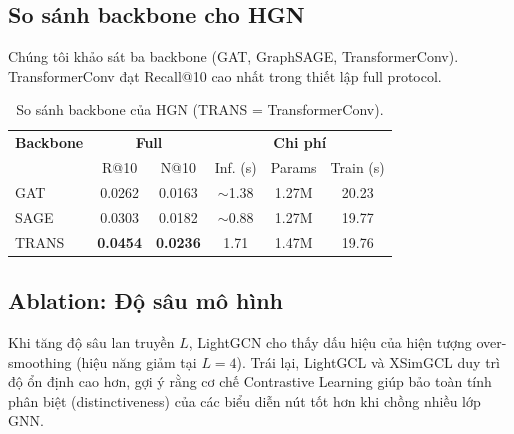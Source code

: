 \documentclass[11pt]{article}
\begin{document}
\subsection{So sánh backbone cho HGN}
Chúng tôi khảo sát ba backbone (GAT, GraphSAGE, TransformerConv). TransformerConv đạt Recall@10 cao nhất trong thiết lập full protocol.

\begin{table}[!htbp]
    \centering
    \small
    \setlength{\tabcolsep}{3pt}
    \renewcommand{\arraystretch}{1.1}
    \begin{tabular}{l|cc|ccc}
        \toprule
        \textbf{Backbone} & \multicolumn{2}{c|}{\textbf{Full}} & \multicolumn{3}{c}{\textbf{Chi phí}}                                   \\
                          & R@10                               & N@10                                 & Inf. (s)   & Params & Train (s) \\
        \midrule
        GAT               & 0.0262                             & 0.0163                               & $\sim$1.38 & 1.27M  & 20.23     \\
        SAGE              & 0.0303                             & 0.0182                               & $\sim$0.88 & 1.27M  & 19.77     \\
        TRANS             & \textbf{0.0454}                    & \textbf{0.0236}                      & 1.71       & 1.47M  & 19.76     \\
        \bottomrule
    \end{tabular}
    \caption{So sánh backbone của HGN (TRANS = TransformerConv).}
    \label{tab:backbone}
\end{table}


\subsection{Ablation: Độ sâu mô hình}
Khi tăng độ sâu lan truyền $L$, LightGCN cho thấy dấu hiệu của hiện tượng over-smoothing (hiệu năng giảm tại $L=4$). Trái lại, LightGCL và XSimGCL duy trì độ ổn định cao hơn, gợi ý rằng cơ chế Contrastive Learning giúp bảo toàn tính phân biệt (distinctiveness) của các biểu diễn nút tốt hơn khi chồng nhiều lớp GNN.
\end{document}
